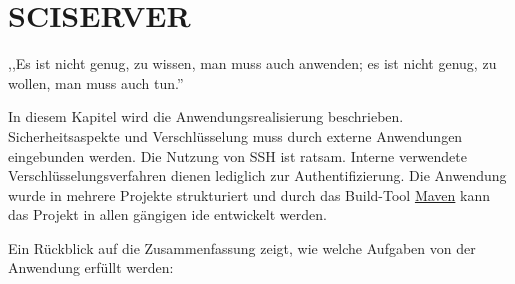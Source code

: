 \documentclass[oneside, ngerman, toc=bibliography,bibliography=totoc,listof=entryprefix, open=right,numbers=noenddot,fontsize=12pt]{scrbook}
\newcommand\chapmd[2]{\begin{mdframed}[%
		rightline=false,leftline=false,topline=false,bottomline=false,frametitlerule=false,
		userdefinedwidth=\textwidth,frametitlealignment=\flushright, %
		frametitlerulecolor=black,frametitle={\small #1}]
		\flushright{} \footnotesize{} #2
	\end{mdframed}}
\begin{document}
\chapter{SCISERVER}
\chapmd{ Johann Wolfgang von Goethe (Werk: Wilhelm Meisters Wanderjahre)}{,,Es ist nicht genug, zu wissen, man muss auch anwenden; es ist nicht genug, zu wollen, man muss auch tun.''}


In diesem Kapitel wird die Anwendungsrealisierung beschrieben. Sicherheitsaspekte und Verschlüsselung muss durch externe Anwendungen eingebunden werden. Die Nutzung von SSH ist ratsam. Interne verwendete Verschlüsselungsverfahren dienen lediglich zur Authentifizierung. Die Anwendung wurde in mehrere Projekte strukturiert und durch das Build-Tool \href{https://maven.apache.org/}{{Maven}} kann das Projekt in allen gängigen \acrshort{ide} entwickelt werden. 


\bigskip
Ein Rückblick auf die Zusammenfassung zeigt, wie welche Aufgaben von der Anwendung erfüllt werden:
\end{document}
